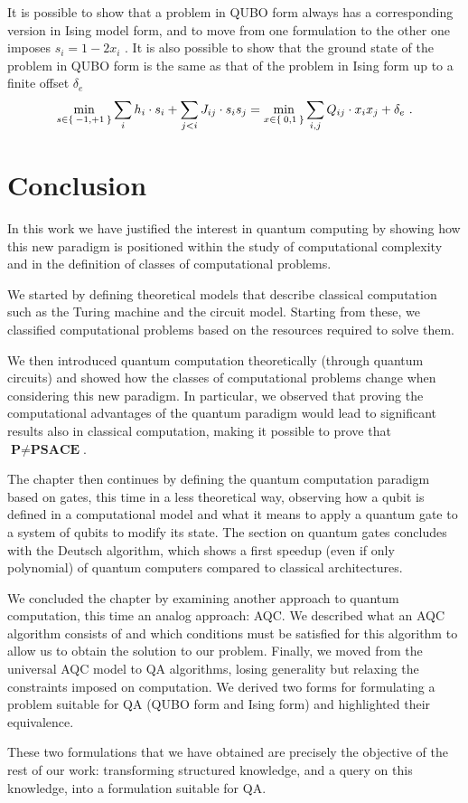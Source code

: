 It is possible to show that a problem in QUBO form always has a corresponding version in Ising model form, and to move from one formulation to the other one imposes $s_i = 1 - 2 x_i$ \cite{bian2010ising}. It is also possible to show that the ground state of the problem in QUBO form is the same as that of the problem in Ising form up to a finite offset $\delta_e$
\begin{equation}
	\min_{s\in\Set{-1, +1}}  \sum_{i}h_i\cdot s_i + \sum_{j < i} J_{ij}\cdot s_i s_j = \min_{x\in\Set{0, 1}} \sum_{i, j}Q_{ij}\cdot x_ix_j + \delta_e\ .
	\label{eqn:ising_qubo}
\end{equation}

\section{Conclusion}
In this work we have justified the interest in quantum computing by showing how this new paradigm is positioned within the study of computational complexity and in the definition of classes of computational problems.

We started by defining theoretical models that describe classical computation such as the Turing machine and the circuit model. Starting from these, we classified computational problems based on the resources required to solve them.

We then introduced quantum computation theoretically (through quantum circuits) and showed how the classes of computational problems change when considering this new paradigm. In particular, we observed that proving the computational advantages of the quantum paradigm would lead to significant results also in classical computation, making it possible to prove that $\textbf{P} \neq \textbf{PSACE}$.

The chapter then continues by defining the quantum computation paradigm based on gates, this time in a less theoretical way, observing how a qubit is defined in a computational model and what it means to apply a quantum gate to a system of qubits to modify its state. The section on quantum gates concludes with the Deutsch algorithm, which shows a first speedup (even if only polynomial) of quantum computers compared to classical architectures.

We concluded the chapter by examining another approach to quantum computation, this time an analog approach: AQC. We described what an AQC algorithm consists of and which conditions must be satisfied for this algorithm to allow us to obtain the solution to our problem. Finally, we moved from the universal AQC model to QA algorithms, losing generality but relaxing the constraints imposed on computation. We derived two forms for formulating a problem suitable for QA (QUBO form and Ising form) and highlighted their equivalence.

These two formulations that we have obtained are precisely the objective of the rest of our work: transforming structured knowledge, and a query on this knowledge, into a formulation suitable for QA.